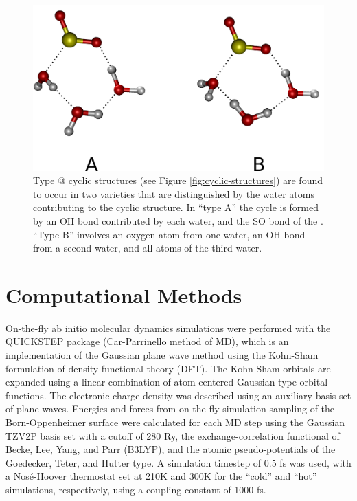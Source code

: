 \documentclass{article}
\makeatletter
\newcommand{\Rmnum}[1]{\expandafter\@slowromancap\romannumeral #1@}
\makeatother
\begin{document}
\begin{figure}[h!]
	\begin{center}
		\includegraphics[scale=1.0]{triple-cycle-types-small.png}
		\caption{Type \Rmnum{3} cyclic structures (see Figure \ref{fig:cyclic-structures}) are found to occur in two varieties that are distinguished by the water atoms contributing to the cyclic structure. In ``type A'' the cycle is formed by an OH bond contributed by each water, and the SO bond of the \suldiox. ``Type B'' involves an oxygen atom from one water, an OH bond from a second water, and all atoms of the third water.}
		\label{fig:type-3-varieties}
	\end{center}
\end{figure}


\section{Computational Methods}

On-the-fly ab initio molecular dynamics simulations were performed with the QUICKSTEP package (Car-Parrinello method of MD), which is an implementation of the Gaussian plane wave method using the Kohn-Sham formulation of density functional theory (DFT).\cite{VandeVondele2005} The Kohn-Sham orbitals are expanded using a linear combination of atom-centered Gaussian-type orbital functions. The electronic charge density was described using an auxiliary basis set of plane waves. Energies and forces from on-the-fly simulation sampling of the Born-Oppenheimer surface were calculated for each MD step using the Gaussian TZV2P basis set with a cutoff of 280 Ry, the exchange-correlation functional of Becke, Lee, Yang, and Parr (B3LYP),\cite{LEE1988} and the atomic pseudo-potentials of the Goedecker, Teter, and Hutter type.\cite{Goedecker1996} A simulation timestep of 0.5 fs was used, with a Nos\'{e}-Hoover thermostat set at 210K and 300K for the ``cold'' and ``hot'' simulations, respectively, using a coupling constant of 1000 fs. %
\end{document}

